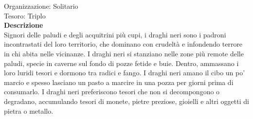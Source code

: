 \begin{multicols}{2}
Organizzazione: Solitario\\
Tesoro: Triplo\\
\textbf{Descrizione}\\
Signori delle paludi e degli acquitrini più cupi, i draghi neri sono i padroni incontrastati del loro territorio, che dominano con crudeltà e infondendo terrore in chi abita nelle vicinanze. I draghi neri si stanziano nelle zone più remote delle paludi, specie in caverne sul fondo di pozze fetide e buie. Dentro, ammassano i loro luridi tesori e dormono tra radici e fango. I draghi neri amano il cibo un po’ marcio e spesso lasciano un pasto a marcire in una pozza per giorni prima di consumarlo. I draghi neri preferiscono tesori che non si decompongono o degradano, accumulando tesori di monete, pietre preziose, gioielli e altri oggetti di pietra o metallo.\\


\end{multicols}
